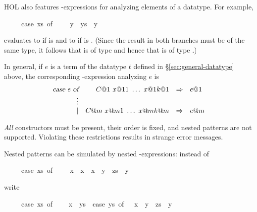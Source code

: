 %
\begin{isabellebody}%
\def\isabellecontext{case{\isacharunderscore}exprs}%
\isamarkupfalse%
%
\isamarkuptrue%
%
\begin{isamarkuptext}%
\label{sec:case-expressions}%
HOL also features -expressions for analyzing
elements of a datatype. For example,
\begin{isabelle}%
\ \ \ \ \ case\ xs\ of\ {\isacharbrackleft}{\isacharbrackright}\ {\isasymRightarrow}\ {\isacharbrackleft}{\isacharbrackright}\ {\isacharbar}\ y\ {\isacharhash}\ ys\ {\isasymRightarrow}\ y%
\end{isabelle}
evaluates to \isa{{\isacharbrackleft}{\isacharbrackright}} if  is \isa{{\isacharbrackleft}{\isacharbrackright}} and to  if 
 is . (Since the result in both branches must be of
the same type, it follows that  is of type  and hence
that  is of type .)

In general, if $e$ is a term of the datatype $t$ defined in
\S\ref{sec:general-datatype} above, the corresponding
-expression analyzing $e$ is
\[
\begin{array}{rrcl}
\isa{case}~e~\isa{of} & C@1~x@ {11}~\dots~x@ {1k@1} & \To & e@1 \\
                           \vdots \\
                           \mid & C@m~x@ {m1}~\dots~x@ {mk@m} & \To & e@m
\end{array}
\]

\begin{warn}
\emph{All} constructors must be present, their order is fixed, and nested
patterns are not supported.  Violating these restrictions results in strange
error messages.
\end{warn}
\noindent
Nested patterns can be simulated by nested -expressions: instead
of
\begin{isabelle}%
\ \ \ \ \ case\ xs\ of\ {\isacharbrackleft}{\isacharbrackright}\ {\isacharequal}{\isachargreater}\ {\isacharbrackleft}{\isacharbrackright}\ {\isacharbar}\ {\isacharbrackleft}x{\isacharbrackright}\ {\isacharequal}{\isachargreater}\ x\ {\isacharbar}\ x\ {\isacharhash}\ {\isacharparenleft}y\ {\isacharhash}\ zs{\isacharparenright}\ {\isacharequal}{\isachargreater}\ y%
\end{isabelle}
write
\begin{isabelle}%
\ \ \ \ \ case\ xs\ of\ {\isacharbrackleft}{\isacharbrackright}\ {\isasymRightarrow}\ {\isacharbrackleft}{\isacharbrackright}\isanewline
\isaindent{\ \ \ \ \ }{\isacharbar}\ x\ {\isacharhash}\ ys\ {\isasymRightarrow}\ case\ ys\ of\ {\isacharbrackleft}{\isacharbrackright}\ {\isasymRightarrow}\ x\ {\isacharbar}\ y\ {\isacharhash}\ zs\ {\isasymRightarrow}\ y%
\end{isabelle}


\end{isamarkuptext}
\end{isabellebody}
